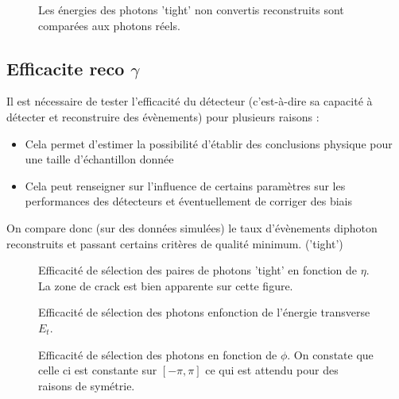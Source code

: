 \documentclass[11pt]{article} %
\begin{document}
\begin{figure}[H]
\centering
  \caption{Les énergies des photons 'tight' non convertis reconstruits sont comparées aux photons réels. }
 \resizebox{.9\linewidth}{!}{}
\end{figure}

\subsection{Efficacite reco $\gamma$}

Il est nécessaire de tester l'efficacité du détecteur (c'est-à-dire sa capacité à détecter et reconstruire des évènements) pour plusieurs raisons :

\begin{itemize}
\item{Cela permet d'estimer la possibilité d'établir des conclusions physique pour une taille d'échantillon donnée}
\item{Cela peut renseigner sur l'influence de certains paramètres sur les performances des détecteurs et éventuellement de corriger des biais}
\end{itemize}

On compare donc (sur des données simulées) le taux d'évènements diphoton reconstruits et passant certains critères de qualité minimum. ('tight')

\begin{figure}[H]
\centering
  \caption{Efficacité de sélection des paires de photons 'tight' en fonction de $\eta$. La zone de \og crack \fg est bien apparente sur cette figure. }
 \resizebox{.9\linewidth}{!}{}
\end{figure}

\begin{figure}[H]
\centering
  \caption{Efficacité de sélection des photons enfonction de l'énergie transverse $E_t$.}
 \resizebox{.9\linewidth}{!}{}
\end{figure}

\begin{figure}[H]
\centering
  \caption{}
 \resizebox{.9\linewidth}{!}{}
  \caption{Efficacité de sélection des photons en fonction de $\phi$. On constate que celle ci est constante sur $[-\pi,\pi]$ ce qui est attendu pour des raisons de symétrie.}
\end{figure}
\end{document}
